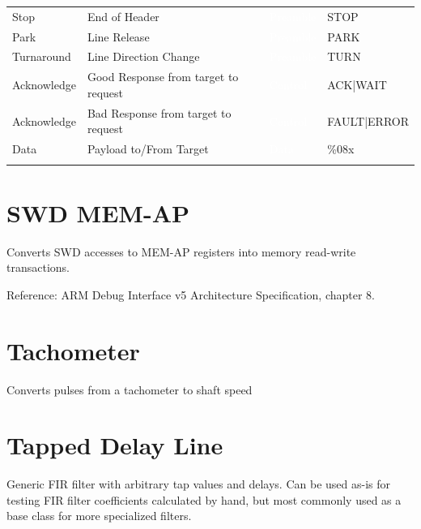 \begin{tabularx}{16cm}{lllX}
Stop & End of Header & \cellcolor{preamble}\textcolor{white}{Preamble} & STOP \\
\thickhline
Park & Line Release & \cellcolor{preamble}\textcolor{white}{Preamble} & PARK \\
\thickhline
Turnaround & Line Direction Change & \cellcolor{preamble}\textcolor{white}{Preamble} & TURN \\
\thickhline
Acknowledge & Good Response from target to request & \cellcolor{control}\textcolor{white}{Control} & ACK|WAIT    \\
\thickhline
Acknowledge & Bad Response from target to request & \cellcolor{control}\textcolor{white}{Control} & FAULT|ERROR    \\
\thickhline
Data & Payload to/From Target & \cellcolor{data}\textcolor{white}{Data} & \%08x \\
\thickhline

\thickhline
\end{tabularx}

\pagebreak
\section{SWD MEM-AP}

Converts SWD accesses to MEM-AP registers into memory read-write transactions.

Reference: ARM Debug Interface v5 Architecture Specification, chapter 8.

\pagebreak
\section{Tachometer}

Converts pulses from a tachometer to shaft speed

\pagebreak
\section{Tapped Delay Line}

Generic FIR filter with arbitrary tap values and delays. Can be used as-is for testing FIR filter coefficients
calculated by hand, but most commonly used as a base class for more specialized filters.

